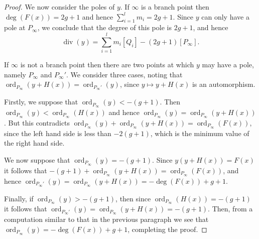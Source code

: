 \documentclass[11pt]{article} %
\theoremstyle{plain}
\theoremstyle{remark}
\DeclareMathOperator{\ord}{ord}
\DeclareMathOperator{\di}{div}
\begin{document}
\begin{proof}
We now consider the poles of $y$.
If $\infty$ is a branch point then $\deg(F(x)) = 2g+1$ and hence $\sum_{i=1}^l m_i = 2g+1$.
Since $y$ can only have a pole at $P_\infty$, we conclude that the degree of this pole is $2g+1$, and hence
\[
\di(y) = \sum_{i=1}^l m_i [Q_i] - (2g+1)[P_\infty].
\]

If $\infty$ is not a branch point then there are two points at which $y$ may have a pole, namely $P_\infty$ and $P_\infty'$.
We consider three cases, noting that $\ord_{P_\infty}(y + H(x)) = \ord_{P_\infty'}(y)$, since $y \mapsto y+H(x)$ is an automorphism.


Firstly, we suppose that $\ord_{P_\infty}(y) < -(g+1)$.
Then $\ord_{P_\infty}(y) < \ord_{P_\infty}(H(x))$ and hence $ \ord_{P_\infty}(y) = \ord_{P_\infty}(y+H(x))$.
But this contradicts $\ord_{P_\infty}(y) + \ord_{P_\infty}(y+H(x)) = \ord_{P_\infty}(F(x))$, since the left hand side is less than $-2(g+1)$, which is the minimum value of the right hand side.

We now suppose that $\ord_{P_\infty} (y) = -(g+1)$. Since $y(y+H(x)) = F(x)$ it follows that $-(g+1) + \ord_{P_\infty}(y+H(x)) = \ord_{P_\infty}(F(x))$, and hence $\ord_{P_\infty'}(y) = \ord_{P_\infty}(y+H(x)) = -\deg(F(x)) + g + 1$.

Finally, if $\ord_{P_\infty}(y) > -(g+1)$, then since $\ord_{P_\infty}(H(x)) = -(g+1)$ it follows that $\ord_{P_\infty'}(y) = \ord_{P_\infty} (y+H(x)) = -(g+1)$.
Then, from a computation similar to that in the previous paragraph we see that $\ord_{P_\infty}(y) = -\deg(F(x)) + g +1$, completing the proof.
\end{proof}
\end{document}

